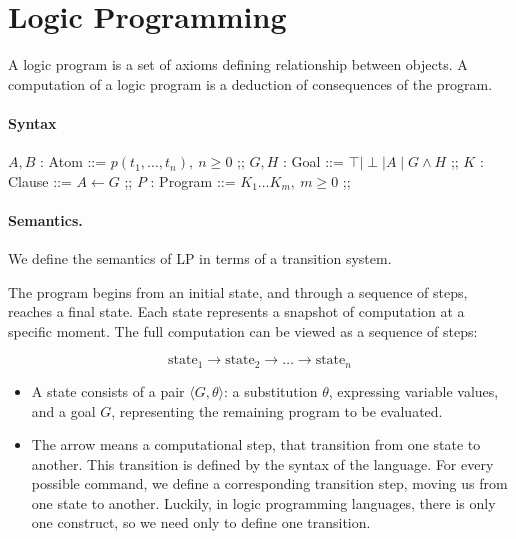\documentclass{article}
\begin{document}
\cleardoublepage
\section{Logic Programming}
A logic program is a set of axioms defining relationship between objects. A
computation of a logic program is a deduction of consequences of the program.

\paragraph{Syntax}
\begin{center}
   \begin{bnf}
        $A,B$ : Atom ::= $p(t_1,\ldots,t_n),\ n\geq0$ ;;
        $G,H$ : Goal ::= $\top \mid \perp\mid A\mid G\land H$ ;;
        $K$ : Clause ::= $A\leftarrow G$ ;;
        $P$ : Program ::= $K_1\ldots K_m,\ m\geq0$ ;;
   \end{bnf} 
\end{center}
\paragraph{Semantics.} We define the semantics of LP in terms of a transition
system.

The program begins from an initial state, and through a sequence of steps,
reaches a final state. Each state represents a snapshot of computation at a
specific moment. The full computation can be viewed as a sequence of steps:

$$\text{state}_1\to\text{state}_2\to\ldots\to\text{state}_n$$

\begin{itemize}
    \item A state consists of a pair $\langle G,\theta\rangle$: a substitution
        $\theta$, expressing variable values, and a goal $G$, representing the
        remaining program to be evaluated.
    \item The arrow means a computational step, that transition from one state
        to another. This transition is defined by the syntax of the language.
        For every possible command, we define a corresponding transition step,
        moving us from one state to another. Luckily, in logic programming
        languages, there is only one construct, so we need only to define one
        transition.
\end{itemize}
\end{document}
